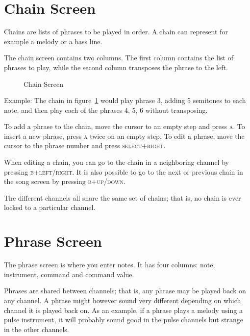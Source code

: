 \section{Chain Screen}
Chains are lists of phrases to be played in order. A chain can represent for example a melody or a bass line.

The chain screen contains two columns. The first column contains the list of phrases
to play, while the second column transposes the phrase to the left.

\begin{figure}[hbtp]
\centering
{}
\caption{Chain Screen}
\label{fig:chainexample}
\end{figure}

Example:
The chain in figure~\ref{fig:chainexample} would play phrase 3, adding 5 semitones to each note, and then play each of the phrases 4, 5, 6 without transposing.

To add a phrase to the chain, move the cursor to an empty step and press \textsc{a}. To
insert a new phrase, press \textsc{a} twice on an empty step. To edit a phrase, move the cursor to the phrase number
and press \textsc{select+right}.

When editing a chain, you can go to the chain in a neighboring channel by pressing \textsc{b+left/right}. It is also possible to go to the next or previous chain in the song screen by
pressing \textsc{b+up/down}.

The different channels all share the same set of chains; that is, no chain is ever locked to a
particular channel.

\section{Phrase Screen}

\begin{figure}[hbtp]
\centering
{}
\end{figure}

The phrase screen is where you enter notes. It has four columns: note, instrument, command and command value.

Phrases are shared between channels; that is, any phrase may be played back on any channel. A phrase might however sound very different depending on which channel it is played back on. As an example, if a phrase plays a melody using a pulse instrument, it will probably sound good in the pulse channels but strange in the other channels.


